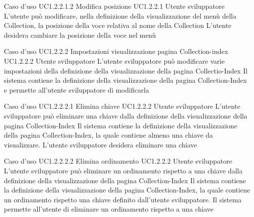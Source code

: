 \UCtitle
{Caso d'uso UC1.2.2.1.2}
{Modifica posizione}
\UC
{UC1.2.2.1}
{Utente sviluppatore}
{L'utente può modificare, nella definizione della visualizzazione del menù della Collection, la posizione della voce relativa al nome della Collection}
{L'utente desidera cambiare la posizione della voce nel menù}



\UCtitle
{Caso d'uso UC1.2.2.2}
{Impostazioni visualizzazione pagina Collection-index}
\UC
{UC1.2.2.2}
{Utente sviluppatore}
{L'utente sviluppatore  può modificare varie impostazioni della definizione della visualizzazione della pagina Collectio-Index}
{Il sistema contiene la definizione della visualizzazione della pagina Collection-Index e permette all'utente sviluppatore di modificarla}

\UCtitle
{Caso d'uso UC1.2.2.2.1}
{Elimina chiave}
\UC
{UC1.2.2.2}
{Utente sviluppatore}
{L'utente sviluppatore  può eliminare una chiave dalla definizione della visualizzazione della pagina Collection-Index}
{Il sistema contiene la definizione della visualizzazione della pagina Collection-Index, la quale contiene almeno una chiave da visualizzare. L'utente sviluppatore desidera eliminare una chiave}


\UCtitle
{Caso d'uso UC1.2.2.2.2}
{Elimina ordinamento}
\UC
{UC1.2.2.2}
{Utente sviluppatore}
{L'utente sviluppatore  può eliminare un ordinamento rispetto a una chiave dalla definizione della visualizzazione della pagina Collection-Index}
{Il sistema contiene la definizione della visualizzazione della pagina Collection-Index, la quale contiene un ordinamento rispetto una chiave definito dall'utente sviluppatore. Il sistema permette all'utente di eliminare un ordinamento rispetto a una chiave}

